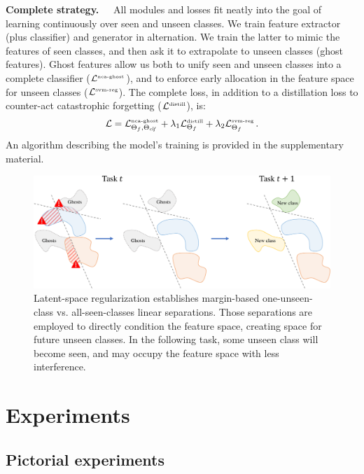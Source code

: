 \textbf{Complete strategy.~~} All modules and losses fit neatly into the goal of learning
continuously over seen and unseen classes. We train feature extractor (plus classifier) and
generator in alternation. We train the latter to mimic the features of seen classes, and then ask it
to extrapolate to unseen classes (ghost features). Ghost features allow us both to unify seen and
unseen classes into a complete classifier ($\mathcal{L}^\text{\tiny{nca-ghost}}$), and to enforce early
allocation in the feature space for unseen classes ($\mathcal{L}^\text{\tiny{svm-reg}}$). The complete
loss, in addition to a distillation loss to counter-act catastrophic forgetting
($\mathcal{L}^\text{\tiny{distill}}$), is:
%
\begin{equation}
    \mathcal{L} = \mathcal{L}^\text{\tiny{nca-ghost}}_{\Theta_f,\Theta_{\textit{clf}}} + \lambda_1 \mathcal{L}^\text{\tiny{distill}}_{\Theta_f} + \lambda_2 \mathcal{L}^\text{\tiny{svm-reg}}_{\Theta_f}\,.
\end{equation}
%
An algorithm describing the model's training is provided in the supplementary material.

\begin{figure}
    \centering
    \includegraphics[width=0.7\linewidth]{images/ghost/svm_reg.pdf}
    \caption{Latent-space regularization establishes margin-based one-unseen-class vs. all-seen-classes linear separations. Those separations are employed to directly condition the feature space, creating space for future unseen classes. In the following task, some unseen class will become seen, and may occupy the feature space with less interference.}
    \label{fig:svm_reg}
\end{figure}

\section{Experiments}
\label{sec:implementation}

\subsection{Pictorial experiments}

